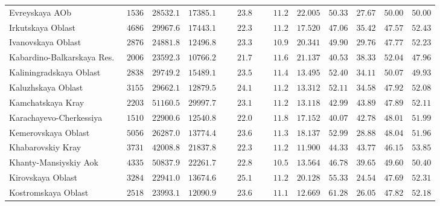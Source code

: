 \documentclass[alpha-refs]{wiley-article-03v}
\begin{document}
{\begin{longtable}{lcccccccccc}
		Evreyskaya AOb  & $\phantom{0}1536$ & $28532.1$ & $17385.1$ & $\phantom{000}23.8$ & $\phantom{000}11.2$ & $22.005$ & $50.33$ & $27.67$ & $50.00$ & $50.00$ \\
		Irkutskaya Oblast  & $\phantom{0}4686$ & $29967.6$ & $17443.1$ & $\phantom{000}22.3$ & $\phantom{000}11.2$ & $17.520$ & $47.06$ & $35.42$ & $47.57$ & $52.43$ \\
		Ivanovskaya Oblast  & $\phantom{0}2876$ & $24881.8$ & $12496.8$ & $\phantom{000}23.3$ & $\phantom{000}10.9$ & $20.341$ & $49.90$ & $29.76$ & $47.77$ & $52.23$ \\
		Kabardino-Balkarskaya Res.  & $\phantom{0}2006$ & $23592.3$ & $10766.2$ & $\phantom{000}21.7$ & $\phantom{000}11.6$ & $21.137$ & $40.53$ & $38.33$ & $52.04$ & $47.96$ \\
		Kaliningradskaya Oblast  & $\phantom{0}2838$ & $29749.2$ & $15489.1$ & $\phantom{000}23.5$ & $\phantom{000}11.4$ & $13.495$ & $52.40$ & $34.11$ & $50.07$ & $49.93$ \\
		Kaluzhskaya Oblast  & $\phantom{0}3155$ & $29662.1$ & $12879.5$ & $\phantom{000}24.1$ & $\phantom{000}11.2$ & $13.312$ & $52.11$ & $34.58$ & $47.92$ & $52.08$ \\
		Kamchatskaya Kray  & $\phantom{0}2203$ & $51160.5$ & $29997.7$ & $\phantom{000}23.1$ & $\phantom{000}11.2$ & $13.118$ & $42.99$ & $43.89$ & $47.89$ & $52.11$ \\
		Karachayevo-Cherkessiya  & $\phantom{0}1510$ & $22900.6$ & $12540.8$ & $\phantom{000}22.0$ & $\phantom{000}11.8$ & $17.152$ & $40.07$ & $42.78$ & $48.01$ & $51.99$ \\
		Kemerovskaya Oblast  & $\phantom{0}5056$ & $26287.0$ & $13774.4$ & $\phantom{000}23.6$ & $\phantom{000}11.3$ & $18.137$ & $52.99$ & $28.88$ & $48.04$ & $51.96$ \\
		Khabarovskiy Kray  & $\phantom{0}3731$ & $42008.8$ & $21837.8$ & $\phantom{000}22.3$ & $\phantom{000}11.2$ & $11.900$ & $44.33$ & $43.77$ & $46.15$ & $53.85$ \\
		Khanty-Mansiyskiy Aok  & $\phantom{0}4335$ & $50837.9$ & $22261.7$ & $\phantom{000}22.8$ & $\phantom{000}10.5$ & $13.564$ & $46.78$ & $39.65$ & $49.60$ & $50.40$ \\
		Kirovskaya Oblast  & $\phantom{0}3284$ & $22941.0$ & $13674.6$ & $\phantom{000}25.1$ & $\phantom{000}11.2$ & $20.128$ & $55.33$ & $24.54$ & $47.69$ & $52.31$ \\
		Kostromskaya Oblast  & $\phantom{0}2518$ & $23993.1$ & $12090.9$ & $\phantom{000}23.6$ & $\phantom{000}11.1$ & $12.669$ & $61.28$ & $26.05$ & $47.82$ & $52.18$ \\

\end{longtable}}
\end{document}
